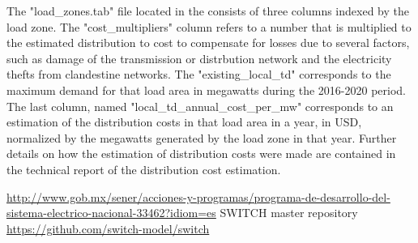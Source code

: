 \documentclass{article}
\begin{document}
The "load\_zones.tab" file located in the  consists of three columns indexed by the load zone. The "cost\_multipliers" column refers to a number that is multiplied to the estimated distribution to cost to compensate for losses due to several factors, such as damage of the transmission or distrbution network and the electricity thefts from clandestine networks. The "existing\_local\_td" corresponds to the maximum demand for that load area in megawatts during the 2016-2020 period. The last column, named "local\_td\_annual\_cost\_per\_mw" corresponds to an estimation of the distribution costs in that load area in a year, in USD, normalized by the megawatts generated by the load zone in that year. Further details on how the estimation of distribution costs were made are contained in the technical report of the distribution cost estimation.

\begin{thebibliography}{9}
 \url{http://www.gob.mx/sener/acciones-y-programas/programa-de-desarrollo-del-sistema-electrico-nacional-33462?idiom=es}
 SWITCH master repository \url{https://github.com/switch-model/switch}
\end{thebibliography}
\end{document}
